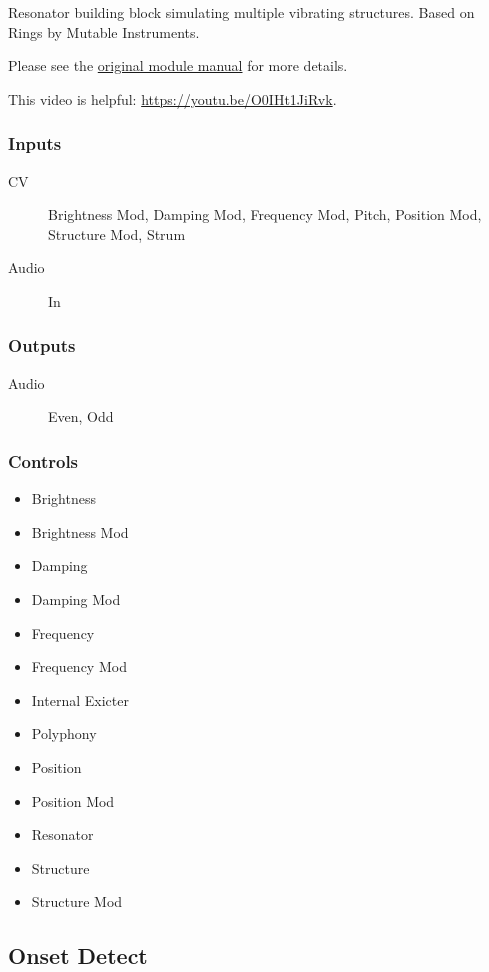 Resonator building block simulating multiple vibrating structures. Based on Rings by Mutable Instruments.

Please see the \href{https://www.mutable-instruments.net/modules/rings/manual/}{original module manual} for more details.

This video is helpful: \url{https://youtu.be/O0IHt1JiRvk}.

\subsubsection{Inputs}
\begin{description}
\item [CV] Brightness Mod, Damping Mod, Frequency Mod, Pitch, Position Mod, Structure Mod, Strum
\item [Audio] In
\end{description}

\subsubsection{Outputs}
\begin{description}
\item [Audio] Even, Odd
\end{description}

\subsubsection{Controls}
\begin{itemize}
\item Brightness
\item Brightness Mod
\item Damping
\item Damping Mod
\item Frequency
\item Frequency Mod
\item Internal Exicter
\item Polyphony
\item Position
\item Position Mod
\item Resonator
\item Structure
\item Structure Mod
\end{itemize}

\subsection{Onset Detect}

